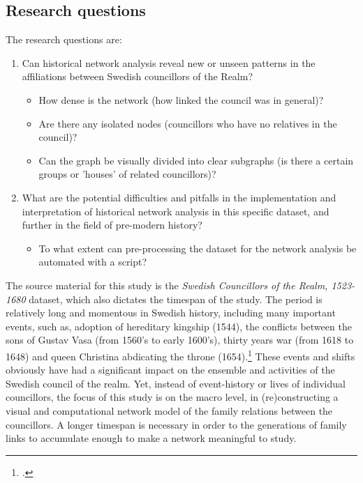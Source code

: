 \subsection{Research questions}
The research questions are:
\begin{enumerate}
	\item Can historical network analysis reveal new or unseen patterns in the affiliations between Swedish councillors of the Realm? \begin{itemize}
		\item How dense is the network (how linked the council was in general)?
		\item Are there any isolated nodes (councillors who have no relatives in the council)?
		\item Can the graph be visually divided into clear subgraphs (is there a certain groups or 'houses' of related councillors)?
	\end{itemize}	
	\item What are the potential difficulties and pitfalls in the implementation and interpretation of historical network analysis in this specific dataset, and further in the field of pre-modern history? \begin{itemize}	
		\item To what extent can pre-processing the dataset for the network analysis be automated with a script?
	\end{itemize}
\end{enumerate} 

The source material for this study is the \textit{Swedish Councillors of the Realm, 1523-1680} dataset, which also dictates the timespan of the study. The period is relatively long and momentous in Swedish history, including many important events, such as, adoption of hereditary kingship (1544), the conflicts between the sons of Gustav Vasa (from 1560's to early 1600's), thirty years war (from 1618 to 1648) and queen Christina abdicating the throne (1654).\footcite[p. 8-9.]{personalAgency} These events and shifts obviously have had a significant impact on the ensemble and activities of the Swedish council of the realm. Yet, instead of event-history or lives of individual councillors, the focus of this study is on the macro level, in (re)constructing a visual and computational network model of the family relations between the councillors. A longer timespan is necessary in order to the generations of family links to accumulate enough to make a network meaningful to study.

